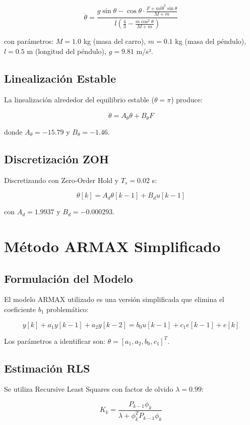 \documentclass[a4paper,openright,9pt]{report}
\begin{document}
\[
\ddot{\theta} = \frac{g \sin\theta - \cos\theta \cdot \frac{F + m l \dot{\theta}^2 \sin\theta}{M + m}}{l \left(\frac{4}{3} - \frac{m \cos^2\theta}{M + m}\right)}
\]

con parámetros: $M = 1.0$ kg (masa del carro), $m = 0.1$ kg (masa del péndulo), $l = 0.5$ m (longitud del péndulo), $g = 9.81$ m/s².

\subsection{Linealización Estable}

La linealización alrededor del equilibrio estable ($\theta = \pi$) produce:

\[
\ddot{\theta} = A_\theta \theta + B_\theta F
\]

donde $A_\theta = -15.79$ y $B_\theta = -1.46$.

\subsection{Discretización ZOH}

Discretizando con Zero-Order Hold y $T_s = 0.02$ s:

\[
\theta[k] = A_d \theta[k-1] + B_d u[k-1]
\]

con $A_d = 1.9937$ y $B_d = -0.000293$.

\section{Método ARMAX Simplificado}

\subsection{Formulación del Modelo}

El modelo ARMAX utilizado es una versión simplificada que elimina el coeficiente $b_1$ problemático:

\[
y[k] + a_1 y[k-1] + a_2 y[k-2] = b_0 u[k-1] + c_1 e[k-1] + e[k]
\]

Los parámetros a identificar son: $\theta = [a_1, a_2, b_0, c_1]^T$.

\subsection{Estimación RLS}

Se utiliza Recursive Least Squares con factor de olvido $\lambda = 0.99$:

\[
K_k = \frac{P_{k-1} \phi_k}{\lambda + \phi_k^T P_{k-1} \phi_k}
\]
\end{document}
